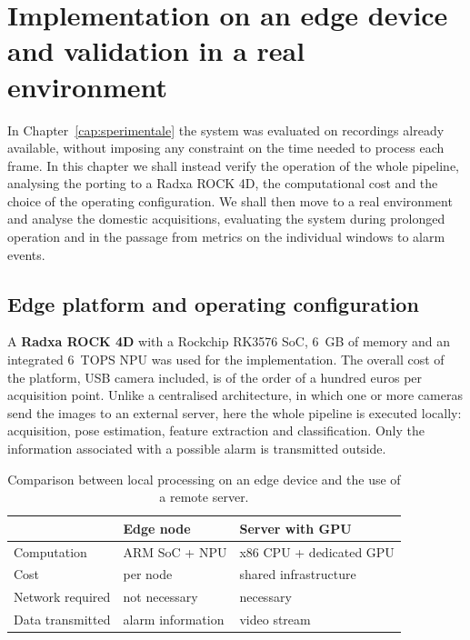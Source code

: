 \chapter{Implementation on an edge device and validation in a real environment}
\label{cap:edge}

In Chapter~\ref{cap:sperimentale} the system was evaluated on recordings already available, without imposing any constraint on the time needed to process each frame. In this chapter we shall instead verify the operation of the whole pipeline, analysing the porting to a Radxa ROCK 4D, the computational cost and the choice of the operating configuration. We shall then move to a real environment and analyse the domestic acquisitions, evaluating the system during prolonged operation and in the passage from metrics on the individual windows to alarm events.

\section{Edge platform and operating configuration}
\label{sec:piattaforma}

A \textbf{Radxa ROCK 4D} with a Rockchip RK3576 SoC, 6~GB of memory and an integrated 6~TOPS NPU was used for the implementation. The overall cost of the platform, USB camera included, is of the order of a hundred euros per acquisition point.
Unlike a centralised architecture, in which one or more cameras send the images to an external server, here the whole pipeline is executed locally: acquisition, pose estimation, feature extraction and classification. Only the information associated with a possible alarm is transmitted outside.

\begin{table}[htbp]
\centering
\caption{Comparison between local processing on an edge device and the use of a remote server.}
\label{tab:edge_vs_server}
\begin{tabularx}{\textwidth}{@{}lXX@{}}
\toprule
& \textbf{Edge node} & \textbf{Server with GPU} \\
\midrule
Computation & ARM SoC + NPU & x86 CPU + dedicated GPU \\
Cost & per node & shared infrastructure \\
Network required & not necessary & necessary \\
Data transmitted & alarm information & video stream \\
\bottomrule
\end{tabularx}
\end{table}

